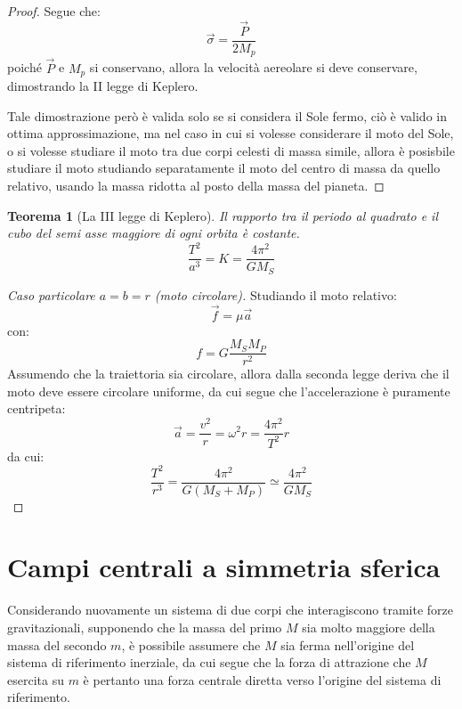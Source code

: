 \documentclass[11pt, a4paper, openright]{book}
\theoremstyle{plain}
\newtheorem{theorem}{Teorema}[section]
\theoremstyle{definition}
\begin{document}
\begin{proof}
    Segue che:
    \begin{equation}
        \vec{\sigma} = \frac{\vec{P}}{2M_p}
    \end{equation}
    poiché $\vec{P}$ e $M_p$ si conservano, allora la velocità aereolare si deve conservare, dimostrando la II legge di Keplero.

    Tale dimostrazione però è valida solo se si considera il Sole fermo, ciò è valido in ottima approssimazione, ma nel caso in cui si volesse considerare il moto del Sole, o si volesse studiare il moto tra due corpi celesti di massa simile, allora è posisbile studiare il moto studiando separatamente il moto del centro di massa da quello relativo, usando la massa ridotta al posto della massa del pianeta.
\end{proof}

\begin{theorem}[La III legge di Keplero]
    Il rapporto tra il periodo al quadrato e il cubo del semi asse maggiore di ogni orbita è costante.
    \begin{equation}
        \frac{T^2}{a^3} = K = \frac{4\pi^2}{GM_S}
    \end{equation}
\end{theorem}

\begin{proof}[Caso particolare $a = b = r$ (moto circolare)]
    Studiando il moto relativo:
    \begin{equation}
        \vec{f} = \mu\vec{a}
    \end{equation}
    con:
    \begin{equation}
        f = G\frac{M_SM_P}{r^2}
    \end{equation}
    Assumendo che la traiettoria sia circolare, allora dalla seconda legge deriva che il moto deve essere circolare uniforme, da cui segue che l'accelerazione è puramente centripeta:
    \begin{equation}
        \vec{a} = \frac{v^2}{r} = \omega^2r = \frac{4\pi^2}{T^2}r
    \end{equation}
    da cui:
    \begin{equation}
        \frac{T^2}{r^3} = \frac{4\pi^2}{G(M_S + M_P)} \simeq \frac{4\pi^2}{GM_S}
    \end{equation}
\end{proof}

\newpage

\section{Campi centrali a simmetria sferica}
Considerando nuovamente un sistema di due corpi che interagiscono tramite forze gravitazionali, supponendo che la massa del primo $M$ sia molto maggiore della massa del secondo $m$, è possibile assumere che $M$ sia ferma nell'origine del sistema di riferimento inerziale, da cui segue che la forza di attrazione che $M$ esercita su $m$ è
pertanto una forza centrale diretta verso l'origine del sistema di riferimento.
\end{document}
